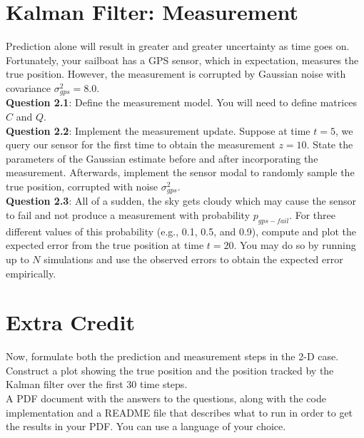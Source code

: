 \documentclass{article}
\begin{document}
\section{Kalman Filter: Measurement}

Prediction alone will result in greater and greater uncertainty as time goes on. Fortunately, your sailboat has a GPS sensor, which in expectation, measures the true position. However, the measurement is corrupted by Gaussian noise with covariance $\sigma_{gps}^2 = 8.0$.\\

{\bf Question 2.1}: Define the measurement model. You will need to define matrices $C$ and $Q$. \\

{\bf Question 2.2}: Implement the measurement update. Suppose at time $t = 5$, we query our sensor for the first time to obtain the measurement $z = 10$. State the parameters of the Gaussian estimate before and after incorporating the measurement. Afterwards, implement the sensor modal to randomly sample the true position, corrupted with noise $\sigma_{gps}^2$. \\

{\bf Question 2.3}: All of a sudden, the sky gets cloudy which may cause the sensor to fail and not produce a measurement with probability $p_{gps-fail}$. For three different values of this probability (e.g., 0.1, 0.5, and 0.9), compute and plot the expected error from the true position at time $t = 20$. You may do so by running up to $N$ simulations and use the observed errors to obtain the expected error empirically.  

\section{Extra Credit}

Now, formulate both the prediction and measurement steps in the 2-D case. Construct a plot showing the true position and the position tracked by the Kalman filter over the first 30 time steps. \\

 A PDF document with the answers to the questions, along with the code implementation and a README file that describes what to run in order to get the results in your PDF. You can use a language of your choice. 


%
%
\end{document}
